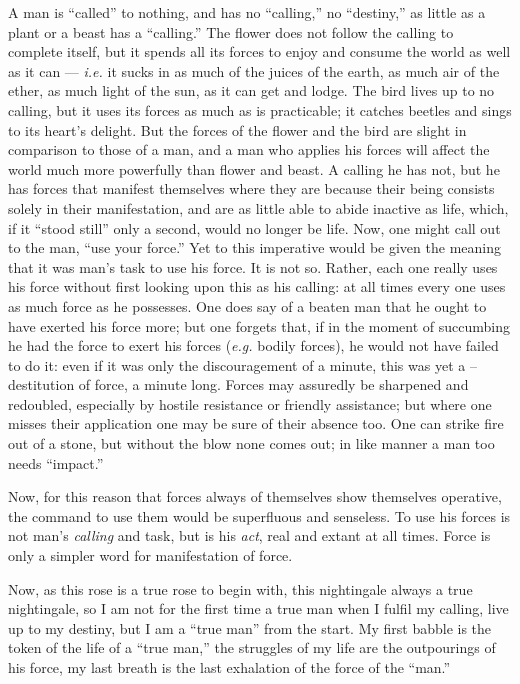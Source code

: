 A man is ``called'' to nothing, and has no ``calling,'' no ``destiny,'' 
as little as a plant or a beast has a ``calling.'' The flower does not 
follow the calling to complete itself, but it spends all its forces to enjoy 
and consume the world as well as it can --- \textit{i.e.} it sucks in as much 
of the juices of the earth, as much air of the ether, as much light of the 
sun, as it can get and lodge. The bird lives up to no calling, but it uses its 
forces as much as is practicable; it catches beetles and sings to its heart's 
delight. But the forces of the flower and the bird are slight in comparison to 
those of a man, and a man who applies his forces will affect the world much 
more powerfully than flower and beast. A calling he has not, but he has forces 
that manifest themselves where they are because their being consists solely in 
their manifestation, and are as little able to abide inactive as life, which, 
if it ``stood still'' only a second, would no longer be life. Now, one might 
call out to the man, ``use your force.'' Yet to this imperative would be 
given the meaning that it was man's task to use his force. It is not so. 
Rather, each one really uses his force without first looking upon this as his 
calling: at all times every one uses as much force as he possesses. One does 
say of a beaten man that he ought to have exerted his force more; but one 
forgets that, if in the moment of succumbing he had the force to exert his 
forces (\textit{e.g.} bodily forces), he would not have failed to do it: even 
if it was only the discouragement of a minute, this was yet a --destitution of 
force, a minute long. Forces may assuredly be sharpened and redoubled, 
especially by hostile resistance or friendly assistance; but where one misses 
their application one may be sure of their absence too. One can strike fire 
out of a stone, but without the blow none comes out; in like manner a man too 
needs ``impact.''

Now, for this reason that forces always of themselves show themselves 
operative, the command to use them would be superfluous and senseless. To use 
his forces is not man's \textit{calling} and task, but is his \textit{act}, 
real and extant at all times. Force is only a simpler word for manifestation 
of force.

Now, as this rose is a true rose to begin with, this nightingale always a true 
nightingale, so I am not for the first time a true man when I fulfil my 
calling, live up to my destiny, but I am a ``true man'' from the start. My 
first babble is the token of the life of a ``true man,'' the struggles of my 
life are the outpourings of his force, my last breath is the last exhalation 
of the force of the ``man.''

